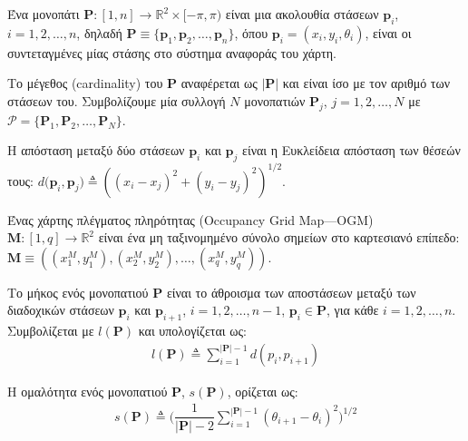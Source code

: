 \begin{bw_box}
\begin{definition}
Ένα μονοπάτι $\bm{P} : [1,n] \rightarrow \mathbb{R}^2 \times [-\pi, \pi)$ είναι
μια ακολουθία στάσεων $\bm{p}_i$, $i = 1,2,\dots,n$, δηλαδή
$\bm{P} \equiv \{\bm{p}_1, \bm{p}_2, \dots, \bm{p}_n\}$, όπου
$\bm{p}_i = (x_i, y_i, \theta_i)$, είναι οι συντεταγμένες μίας στάσης στο
σύστημα αναφοράς του χάρτη.
\end{definition}
\end{bw_box}

Το μέγεθος (cardinality) του $\bm{P}$ αναφέρεται ως $|\bm{P}|$ και είναι ίσο με
τον αριθμό των στάσεων του. Συμβολίζουμε μία συλλογή $N$ μονοπατιών $\bm{P}_j$,
$j = 1,2,\dots,N$ με $\bm{\mathcal{P}} = \{\bm{P}_1, \bm{P}_2, \dots,
\bm{P}_N\}$.

\begin{bw_box}
\begin{definition}
Η απόσταση μεταξύ δύο στάσεων $\bm{p}_i$ και $\bm{p}_j$ είναι η
Ευκλείδεια απόσταση των θέσεών τους:
$d\bm{(p}_i,\bm{p}_j) \triangleq ((x_i - x_j)^2 + (y_i - y_j)^2)^{1/2}$.
\end{definition}
\end{bw_box}

\begin{bw_box}
\begin{definition}
Ένας χάρτης πλέγματος πληρότητας (Occupancy Grid Map---OGM)
$\bm{M} : [1, q] \rightarrow \mathbb{R}^2$ είναι ένα
μη ταξινομημένο σύνολο σημείων στο καρτεσιανό επίπεδο:
$\bm{M} \equiv ((x_1^M, y_1^M), (x_2^M, y_2^M), \dots, (x_q^M, y_q^M) )$.
\end{definition}
\end{bw_box}

\begin{bw_box}
\begin{definition}
Το μήκος ενός μονοπατιού $\bm{P}$ είναι το άθροισμα των αποστάσεων μεταξύ των
διαδοχικών στάσεων $\bm{p}_i$ και $\bm{p}_{i+1}$, $i = 1,2,\dots,n-1$,
$\bm{p}_i \in \bm{P}$, για κάθε $i = 1,2,\dots,n$. Συμβολίζεται με $l(\bm{P})$
και υπολογίζεται ως:
\begin{align}
  l(\bm{P}) \triangleq \sum\limits_{i=1}^{|\bm{P}|-1} d(p_i, p_{i+1})
  \label{eq:path_length}
\end{align}
\end{definition}
\end{bw_box}

\begin{bw_box}
\begin{definition}
Η ομαλότητα ενός μονοπατιού $\bm{P}$, $s(\bm{P})$, ορίζεται ως:
\begin{align}
  s(\bm{P}) \triangleq \Big(\dfrac{1}{|\bm{P}|-2}\sum\limits_{i=1}^{|\bm{P}|-1} (\theta_{i+1} - \theta_i)^2\Big)^{1/2}
  \label{eq:path_smoothness}
\end{align}
\end{definition}
\end{bw_box}

